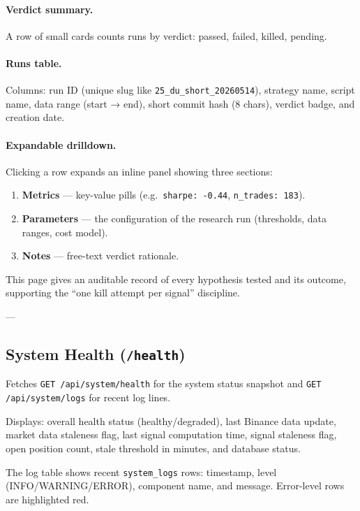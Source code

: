 \documentclass[12pt, a4paper]{article}
\begin{document}
\paragraph{Verdict summary.}
A row of small cards counts runs by verdict: passed, failed, killed, pending.

\paragraph{Runs table.}
Columns: run ID (unique slug like \texttt{25\_du\_short\_20260514}), strategy
name, script name, data range (start → end), short commit hash (8 chars), verdict
badge, and creation date.

\paragraph{Expandable drilldown.}
Clicking a row expands an inline panel showing three sections:
\begin{enumerate}[noitemsep]
  \item \textbf{Metrics} — key-value pills (e.g.\ \texttt{sharpe: -0.44},
        \texttt{n\_trades: 183}).
  \item \textbf{Parameters} — the configuration of the research run
        (thresholds, data ranges, cost model).
  \item \textbf{Notes} — free-text verdict rationale.
\end{enumerate}

This page gives an auditable record of every hypothesis tested and its
outcome, supporting the ``one kill attempt per signal'' discipline.

---

\subsection{System Health (\texttt{/health})}

Fetches \texttt{GET /api/system/health} for the system status snapshot and
\texttt{GET /api/system/logs} for recent log lines.

Displays: overall health status (healthy/degraded), last Binance data update,
market data staleness flag, last signal computation time, signal staleness flag,
open position count, stale threshold in minutes, and database status.

The log table shows recent \texttt{system\_logs} rows: timestamp, level
(INFO/WARNING/ERROR), component name, and message. Error-level rows are
highlighted red.
\end{document}
